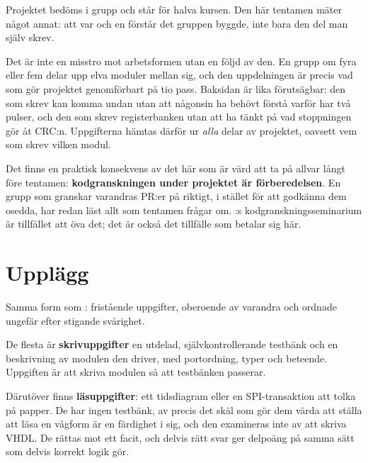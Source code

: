 Projektet bedöms i grupp och står för halva kursen. Den här tentamen mäter något annat: att var och
en förstår det gruppen byggde, inte bara den del man själv skrev.

Det är inte en misstro mot arbetsformen utan en följd av den. En grupp om fyra eller fem delar upp
elva moduler mellan sig, och den uppdelningen är precis vad som gör projektet genomförbart på tio
pass. Baksidan är lika förutsägbar: den som skrev  kan komma undan utan att någonsin ha
behövt förstå varför  har två pulser, och den som skrev registerbanken utan att ha
tänkt på vad stoppningen gör åt CRC:n. Uppgifterna hämtas därför ur \emph{alla} delar av projektet,
oavsett vem som skrev vilken modul.

\begin{aside}
Det finns en praktisk konsekvens av det här som är värd att ta på allvar långt före tentamen:
\textbf{kodgranskningen under projektet är förberedelsen}. En grupp som granskar varandras PR:er på
riktigt, i stället för att godkänna dem osedda, har redan läst allt som tentamen frågar om.
:s kodgranskningsseminarium är tillfället att öva det; det är också det tillfälle som
betalar sig här.
\end{aside}

\section{Upplägg}
\label{c20:sec:format}

Samma form som : fristående uppgifter, oberoende av varandra och ordnade ungefär efter
stigande svårighet.

De flesta är \textbf{skrivuppgifter} \textemdash{} en utdelad, självkontrollerande testbänk och en
beskrivning av modulen den driver, med portordning, typer och beteende. Uppgiften är att skriva
modulen så att testbänken passerar.

Därutöver finns \textbf{läsuppgifter}: ett tidsdiagram eller en SPI-transaktion att tolka på papper.
De har ingen testbänk, av precis det skäl som gör dem värda att ställa \textemdash{} att läsa en
vågform är en färdighet i sig, och den examineras inte av att skriva VHDL. De rättas mot ett facit,
och delvis rätt svar ger delpoäng på samma sätt som delvis korrekt logik gör.

